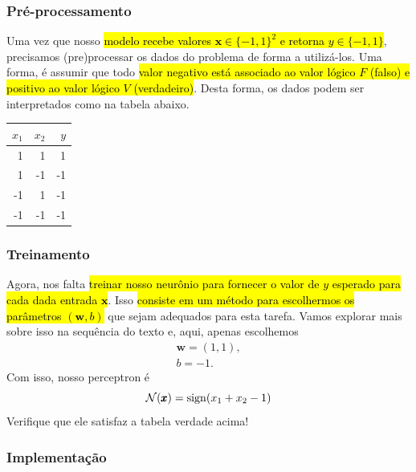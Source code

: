 \subsubsection{Pré-processamento}

Uma vez que nosso \hl{modelo recebe valores $\pmb{x}\in \{-1,1\}^2$ e retorna $y\in\{-1,1\}$}, precisamos (pre)processar os dados do problema de forma a utilizá-los. Uma forma, é assumir que todo \hl{valor negativo está associado ao valor lógico $F$ (falso) e positivo ao valor lógico $V$ (verdadeiro)}. Desta forma, os dados podem ser interpretados como na tabela abaixo.

\begin{center}
  \begin{tabular}{rr|r}
    $x_1$ & $x_2$ & $y$\\\hline
    1 & 1 & 1\\
    1 & -1 & -1\\
    -1 & 1 & -1\\
    -1 & -1 & -1\\\hline
  \end{tabular}
\end{center}
    
    
\subsubsection{Treinamento}

Agora, nos falta \hl{treinar nosso neurônio para fornecer o valor de $y$ esperado para cada dada entrada $\pmb{x}$}. Isso \hl{consiste em um método para escolhermos os parâmetros $(\pmb{w}, b)$} que sejam adequados para esta tarefa. Vamos explorar mais sobre isso na sequência do texto e, aqui, apenas escolhemos
\begin{gather}
  \pmb{w} = (1, 1),\\
  b = -1.
\end{gather}
Com isso, nosso perceptron é
\begin{equation}
  \mathcal{N}(\pmb{x}) = \operatorname{sign}(x_1 + x_2 - 1)
\end{equation}
Verifique que ele satisfaz a tabela verdade acima!


\subsubsection{Implementação}

